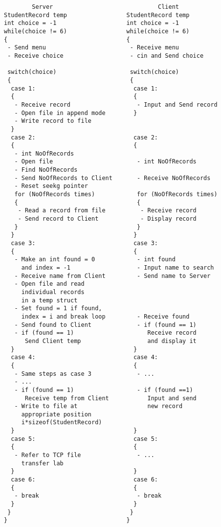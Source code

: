 \documentclass[12pt,a4paper]{article}
\begin{document}
\begin{lstlisting}
        Server                              Client
StudentRecord temp                 StudentRecord temp
int choice = -1                    int choice = -1
while(choice != 6)                 while(choice != 6)
{                                  {
 - Send menu                        - Receive menu
 - Receive choice                   - cin and Send choice
    
 switch(choice)                     switch(choice)
 {                                  {
  case 1:                            case 1:
  {                                  {
   - Receive record                   - Input and Send record
   - Open file in append mode        }
   - Write record to file
  }
  case 2:                            case 2:
  {                                  {
   - int NoOfRecords 
   - Open file                        - int NoOfRecords
   - Find NoOfRecords
   - Send NoOfRecords to Client       - Receive NoOfRecords
   - Reset seekg pointer
   for (NoOfRecords times)            for (NoOfRecords times)
   {                                  {
    - Read a record from file          - Receive record
    - Send record to Client            - Display record
   }                                  }
  }                                  }
  case 3:                            case 3:
  {                                  {
   - Make an int found = 0            - int found
     and index = -1                   - Input name to search
   - Receive name from Client         - Send name to Server
   - Open file and read             
     individual records
     in a temp struct
   - Set found = 1 if found,
     index = i and break loop         - Receive found
   - Send found to Client             - if (found == 1)
   - if (found == 1)                     Receive record
      Send Client temp                   and display it
  }                                  }
  case 4:                            case 4:
  {                                  {
   - Same steps as case 3             - ...
   - ...
   - if (found == 1)                  - if (found ==1)
      Receive temp from Client           Input and send
   - Write to file at                    new record
     appropriate position            
     i*sizeof(StudentRecord)
  }                                  }
  case 5:                            case 5:
  {                                  { 
   - Refer to TCP file                - ...
     transfer lab
  }                                  }
  case 6:                            case 6:
  {                                  {
   - break                            - break
  }                                  }
 }                                  }
}                                  }
\end{lstlisting}
\end{document}
